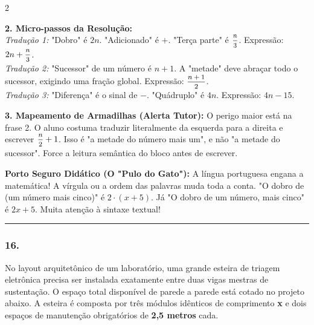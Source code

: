 \begin{multicols*}{2}
\begin{tcolorbox}[colback=CorTitUm!5, colframe=CorTitUm, boxrule=1pt, arc=4pt, left=6pt, right=6pt, top=6pt, bottom=6pt]
    \textbf{2. Micro-passos da Resolução:}\\
    \textit{Tradução 1:} "Dobro" é $2n$. "Adicionado" é $+$. "Terça parte" é $\mfrac{n}{3}$. Expressão: $2n + \mfrac{n}{3}$.\\
    \textit{Tradução 2:} "Sucessor" de um número é $n + 1$. A "metade" deve abraçar todo o sucessor, exigindo uma fração global. Expressão: $\mfrac{n + 1}{2}$.\\
    \textit{Tradução 3:} "Diferença" é o sinal de $-$. "Quádruplo" é $4n$. Expressão: $4n - 15$.\par\vspace{0.1cm}
    
    \textbf{3. Mapeamento de Armadilhas (Alerta Tutor):} O perigo maior está na frase 2. O aluno costuma traduzir literalmente da esquerda para a direita e escrever $\mfrac{n}{2} + 1$. Isso é "a metade do número mais um", e não "a metade do sucessor". Force a leitura semântica do bloco antes de escrever.
    \end{tcolorbox}
    \vspace{0.15cm}
    
    \begin{boxexplicacao}
    \textbf{Porto Seguro Didático (O "Pulo do Gato"):} A língua portuguesa engana a matemática! A vírgula ou a ordem das palavras muda toda a conta. "O dobro de (um número mais cinco)" é $2 \cdot (x + 5)$. Já "O dobro de um número, mais cinco" é $2x + 5$. Muita atenção à sintaxe textual!
    \end{boxexplicacao}
\fi

\par\vspace{\espacoQuestao}


\noindent\textcolor{CorLinha}{\rule{\linewidth}{0.5pt}} 
\par\vspace{\espacoPreQuestao}
\subsubsection*{16.} 
\begin{enunciadoLiteral}
No layout arquitetônico de um laboratório, uma grande esteira de triagem eletrônica precisa ser instalada exatamente entre duas vigas mestras de sustentação. O espaço total disponível de parede a parede está cotado no projeto abaixo. A esteira é composta por três módulos idênticos de comprimento \textbf{x} e dois espaços de manutenção obrigatórios de \textbf{2,5 metros} cada.


\end{enunciadoLiteral}
\end{multicols*}

